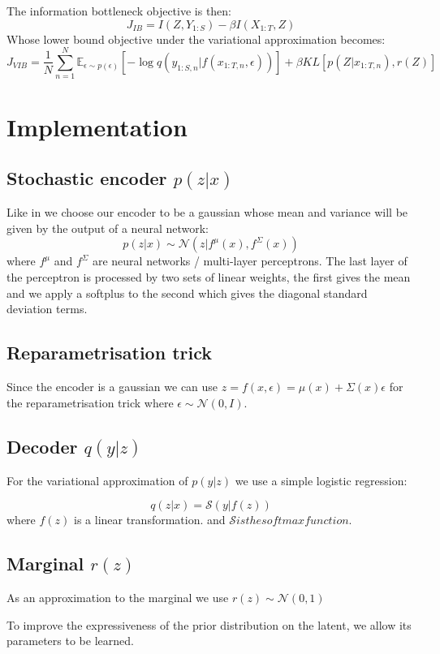 \documentclass[10pt,oneside,openright]{report}
\begin{document}
The information bottleneck objective is then:
$$ J_{IB} = I(Z, Y_{1:S}) - \beta I(X_{1:T}, Z)$$
Whose lower bound objective under the variational approximation becomes:
 $$ J_{VIB} = \frac{1}{N}  \sum_{n=1}^{N} \mathbb{E}_{\epsilon \sim p(\epsilon)}[- \log q(y_{1:S, n} |f(x_{1:T, n}, \epsilon))] + \beta KL[p(Z|x_{1:T, n}), r(Z)]$$

\chapter{Implementation}
\section{Stochastic encoder $p(z|x)$}
Like in \cite{vib} we choose our encoder to be a gaussian whose mean and variance will be given by the output of a neural network:
$$ p(z|x) \sim \mathcal{N}(z | f^\mu(x), f^\Sigma(x))$$ where $f^\mu$ and $f^\Sigma$ are neural networks / multi-layer perceptrons. The last layer of the perceptron is processed by two sets of linear weights, the first gives the mean and we apply a softplus to the second which gives the diagonal standard deviation terms.

\section{Reparametrisation trick}
Since the encoder is a gaussian we can use  $z = f(x, \epsilon) =  \mu(x) + \Sigma(x) \epsilon$ for the reparametrisation trick where $\epsilon \sim \mathcal{N}(0, I)$. 
 
\section{Decoder $q(y|z)$}
For the variational approximation of $p(y|z)$ we use a simple logistic regression:

$$ q(z|x) = \mathcal{S}(y|f(z))$$ where $f(z)$ is a linear transformation. and $\mathcal{S} is the softmax function.$

\section{Marginal $r(z)$}

As an approximation to the marginal we use $r(z) \sim \mathcal{N}(0, 1)$

To improve the expressiveness of the prior distribution on the latent, we allow its parameters to be learned. 
\end{document}
